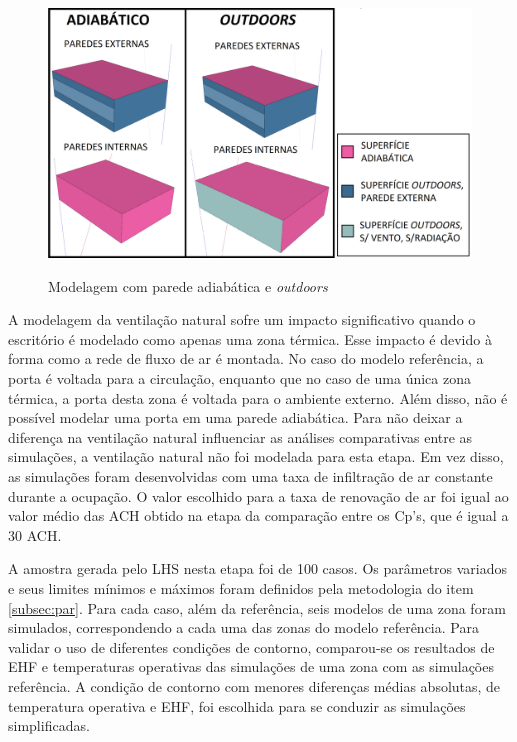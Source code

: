 \documentclass[brazil,hardcopy,openany,a5paper]{ufscthesis}
\begin{document}
		\begin{figure}[h]
			\centering
			\caption{Modelagem com parede adiabática e \textit{outdoors}}
			\includegraphics[width=1\linewidth]{img/adiabatic_outdoors.png}
			\label{fig:adiabatic_outdoors}
		\end{figure}
	
		
		A modelagem da ventilação natural sofre um impacto significativo quando o escritório é modelado como apenas uma zona térmica.
		Esse impacto é devido à forma como a rede de fluxo de ar é montada. No caso do modelo referência, a porta é voltada para a circulação, enquanto que no caso de uma única zona térmica, a porta desta zona é voltada para o ambiente externo. 
		Além disso, não é possível modelar uma porta em uma parede adiabática. Para não deixar a diferença na ventilação natural influenciar as análises comparativas entre as simulações, a ventilação natural não foi modelada para esta etapa.
		Em vez disso, as simulações foram desenvolvidas com uma taxa de infiltração de ar constante durante a ocupação. O valor escolhido para a taxa de renovação de ar foi igual ao valor médio das ACH obtido na etapa da comparação entre os Cp's, que é igual a 30 ACH.
		
		A amostra gerada pelo LHS nesta etapa foi de 100 casos.
		Os parâmetros variados e seus limites mínimos e máximos foram definidos pela metodologia do item \ref{subsec:par}.
		Para cada caso, além da referência, seis modelos de uma zona foram simulados, correspondendo a cada uma das zonas do modelo referência.
		Para validar o uso de diferentes condições de contorno, comparou-se os resultados de EHF e temperaturas operativas das simulações de uma zona com as simulações referência.
		A condição de contorno com menores diferenças médias absolutas, de temperatura operativa e EHF, foi escolhida para se conduzir as simulações simplificadas.
		
\end{document}
